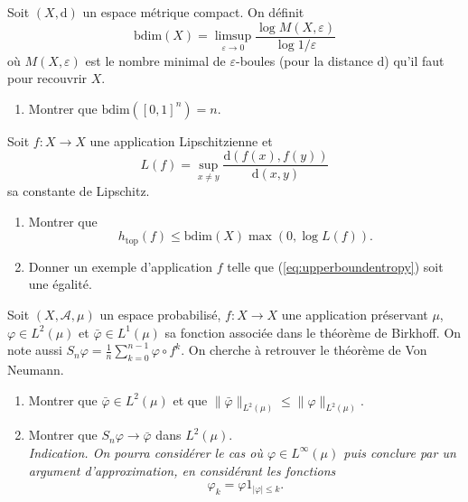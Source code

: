 \documentclass[a4paper,10pt,openany]{article}
\theoremstyle{plain}
\theoremstyle{definition}
\newcommand{\dd}{\mathrm{d}}
\begin{document}
\vspace{0.6cm}



 \vspace{1.5mm} 

\noindent Soit $(X,\dd)$ un espace m\'etrique compact. On d\'efinit
$$
\mathrm{bdim}(X) = \limsup_{\varepsilon \to 0}\frac{\log M(X,\varepsilon)}{\log1/\varepsilon}
$$
o\`u $M(X,\varepsilon)$ est le nombre minimal de $\varepsilon$-boules (pour la distance $\dd$) qu'il faut pour recouvrir $X$. 
\begin{enumerate}
\item Montrer que $\mathrm{bdim} \left([0,1]^n\right) = n$. 
\end{enumerate}
Soit $f : X \to X$ une application Lipschitzienne et
$$
L(f) = \sup_{x \neq y} \frac{\dd(f(x), f(y))}{\dd(x,y)}
$$
sa constante de Lipschitz.

\begin{enumerate}[resume]
\item Montrer que 
\begin{equation}\label{eq:upperboundentropy}
h_{\mathrm{top}}(f) \leq \mathrm{bdim}(X) \max(0, \log L(f)).
\end{equation}
\item Donner un exemple d'application $f$ telle que (\ref{eq:upperboundentropy}) soit une \'egalit\'e.
\end{enumerate}
\vspace{0.6cm}



 \vspace{1.5mm} 

\noindent Soit $(X, \mathscr{A}, \mu)$ un espace probabilis\'e, $f : X \to X$ une application pr\'eservant $\mu$, $\varphi \in L^2(\mu)$ et $\bar \varphi \in L^1(\mu)$ sa fonction associ\'ee dans le th\'eor\`eme de Birkhoff. On note aussi $\displaystyle{S_n\varphi = \frac{1}{n} \sum_{k=0}^{n-1} \varphi \circ f^k}$. On cherche \`a retrouver le th\'eor\`eme de Von Neumann.

\begin{enumerate}
\iffalse
\item Montrer que 
$\displaystyle{
\left(\int_X |\bar \varphi|^2 \dd \mu \right)^{1/2} \leq \liminf_n \left(\int_X \left|S_n\varphi\right|^2\right)^{1/2}.}
$
\fi
\item Montrer que $\bar \varphi \in L^2(\mu)$ et que $\|\bar \varphi\|_{L^2(\mu)} \leq \|\varphi\|_{L^2(\mu)}$.
\item Montrer que $S_n \varphi \to \bar \varphi$ dans $L^2(\mu).$ \\
\textit{Indication. On pourra consid\'erer le cas o\`u $\varphi \in L^\infty(\mu)$ puis conclure par un argument d'approximation, en consid\'erant les fonctions
$$
\varphi_k = \varphi 1_{|\varphi| \leqslant k}.
$$}
\end{enumerate}
\end{document}

